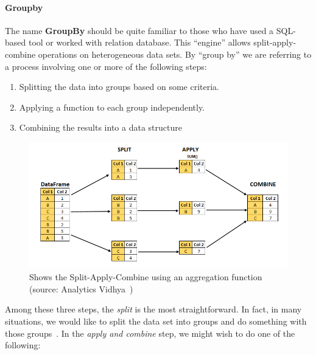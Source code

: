 \paragraph{Groupby}
The name \textbf{GroupBy} should be quite familiar to those who have used a SQL-based tool or worked with relation database. This ``engine'' allows split-apply-combine operations on heterogeneous data sets.
By ``group by'' we are referring to a process involving one or more of the following steps:
\begin{enumerate}
    \item Splitting the data into groups based on some criteria.
    \item Applying a function to each group independently.
    \item Combining the results into a data structure
\end{enumerate}
\begin{figure}[ht]
    \centering
    \includegraphics[width=\textwidth]{content/chapter_3/images/split-apply-combine.png}
    \caption{Shows the Split-Apply-Combine using an aggregation function (source: Analytics Vidhya~\cite{Misc:pandey_split-apply-combine})}\label{fig:pandas_groupby}
\end{figure}
Among these three steps, the \textit{split} is the most straightforward. In fact, in many situations, we would like to split the data set into groups and do something with those groups~\cite{reback_pandas-dev/pandas:_2022}.
In the \textit{apply and combine} step, we might wish to do one of the following:
